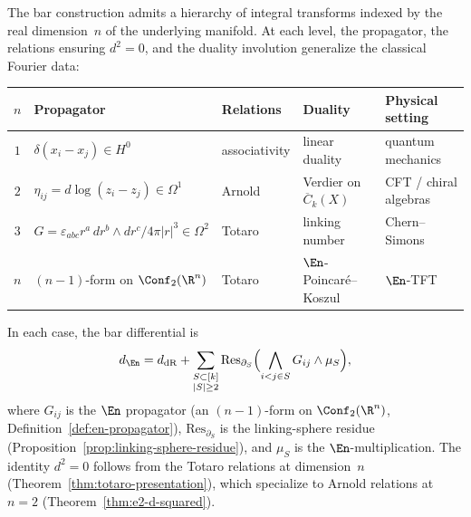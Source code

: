 \begin{proposition}
\label{prop:en-fourier-hierarchy}
The bar construction admits a hierarchy of integral transforms
indexed by the real dimension~$n$ of the underlying manifold.
At each level, the propagator, the relations ensuring $d^2 = 0$,
and the duality involution generalize the classical Fourier data:

\medskip
\begin{center}
\small
\renewcommand{\arraystretch}{1.3}
\begin{tabular}{@{}cllll@{}}
\hline
$n$ & Propagator & Relations & Duality & Physical setting \\
\hline
$1$ & $\delta(x_i - x_j) \in H^0$
  & associativity & linear duality
  & quantum mechanics \\[2pt]
$2$ & $\eta_{ij} = d\log(z_i - z_j) \in \Omega^1$
  & Arnold & Verdier on $\overline{C}_k(X)$
  & CFT / chiral algebras \\[2pt]
$3$ & $G = \varepsilon_{abc} r^a\, dr^b \wedge dr^c / 4\pi|r|^3
    \in \Omega^2$
  & Totaro & linking number
  & Chern--Simons \\[2pt]
$n$ & $(n{-}1)$-form on $\Conf_2(\R^n)$
  & Totaro & $\En$-Poincar\'e--Koszul
  & $\En$-TFT \\
\hline
\end{tabular}
\end{center}
\medskip

\noindent
In each case, the bar differential is
\[
d_{\En}
= d_{\mathrm{dR}}
+ \sum_{\substack{S \subset [k] \\ |S| \geq 2}}
\mathrm{Res}_{\partial_S}
\Bigl(\bigwedge_{i < j \in S} G_{ij} \wedge \mu_S\Bigr),
\]
where $G_{ij}$ is the $\En$ propagator
\textup{(}an $(n{-}1)$-form on $\Conf_2(\R^n)$,
Definition~\textup{\ref{def:en-propagator})},
$\mathrm{Res}_{\partial_S}$ is the linking-sphere residue
\textup{(}Proposition~\textup{\ref{prop:linking-sphere-residue})},
and $\mu_S$ is the $\En$-multiplication.  The identity $d^2 = 0$
follows from the Totaro relations at dimension~$n$
\textup{(}Theorem~\textup{\ref{thm:totaro-presentation})},
which specialize to Arnold relations at $n = 2$
\textup{(}Theorem~\textup{\ref{thm:e2-d-squared})}.
\end{proposition}

